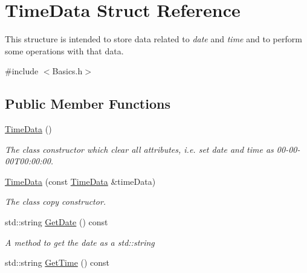 \hypertarget{structTimeData}{}\section{Time\+Data Struct Reference}
\label{structTimeData}


This structure is intended to store data related to {\itshape date} and {\itshape time} and to perform some operations with that data.  




{\ttfamily \#include $<$Basics.\+h$>$}

\subsection*{Public Member Functions}
\begin{DoxyCompactItemize}
\item 
\mbox{\label{structTimeData_a4be51d0cd0dce3b91ce449b6c995a9e9}} 
\hyperlink{structTimeData_a4be51d0cd0dce3b91ce449b6c995a9e9}{Time\+Data} ()
\begin{DoxyCompactList}\small\item\em The class\textquotesingle{} constructor which clear all attributes, i.\+e. set date and time as 00-\/00-\/00\+T00\+:00\+:00. \end{DoxyCompactList}\item 
\hyperlink{structTimeData_af0454b54d768d6b21267b3692dae4d3d}{Time\+Data} (const \hyperlink{structTimeData}{Time\+Data} \&time\+Data)
\begin{DoxyCompactList}\small\item\em The class\textquotesingle{} copy constructor. \end{DoxyCompactList}\item 
\mbox{\label{structTimeData_a78640fbf87e59255e08836b6779ec5c0}} 
std\+::string \hyperlink{structTimeData_a78640fbf87e59255e08836b6779ec5c0}{Get\+Date} () const
\begin{DoxyCompactList}\small\item\em A method to get the date as a {\ttfamily std\+::string} \end{DoxyCompactList}\item 
\mbox{\label{structTimeData_a6810621b9bd2289b697a7cd7b1799515}} 
std\+::string \hyperlink{structTimeData_a6810621b9bd2289b697a7cd7b1799515}{Get\+Time} () const

\end{DoxyCompactItemize}
